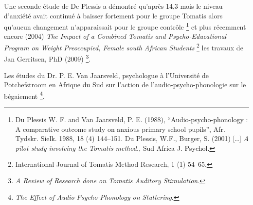 Une seconde étude de De Plessis a démontré qu'après 14,3
mois le niveau d'an\-xié\-té avait continué à baisser fortement
pour le groupe Tomatis alors qu'aucun
changement n'apparaissait pour le groupe contrôle%
\footnote{Du Plessis W. F. and Van Jaarsveld, P. E. (1988),
	``Audio-psycho-phonology : A comparative outcome study on anxious primary school pupils'',  Afr. Tydskr. Sielk. 1988,
	18 (4) 144--151. Du Plessis, W.F., Burger, S. (2001) [\ldots]
	\emph{A pilot study involving the Tomatis method.}, Sud Africa J. Psychol.}
 et plus récemment encore (2004) \emph{The Impact of a Combined
 	Tomatis and Psycho-Educational Program on Weight Preoccupied,
 	 Female south African Students}%
  \footnote{International Journal of Tomatis Method Research, 1 (1) 54--65.}  les travaux de Jan Gerritsen, PhD (2009)%
  \footnote{\emph{A Review of Research done on Tomatis Auditory Stimulation}.}.
  
  Les études du Dr. P. E. Van Jaarsveld, psychologue à l'Université de Potchefstroom en Afrique du Sud sur l'action de l'audio-psycho-phonologie sur le bégaiement%
  \footnote{\emph{The Effect of Audio-Psycho-Phonology on Stuttering}.}.


